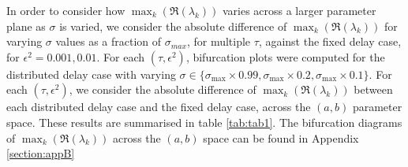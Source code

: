 In order to consider how $\max_k(\Re(\lambda_k))$ varies across a larger parameter plane as $\sigma$ is varied, we consider the absolute difference of $\max_k(\Re(\lambda_k))$ for varying $\sigma$ values as a fraction of $\sigma_{max}$, for multiple $\tau$, against the fixed delay case, for $\epsilon^2=0.001,0.01$. For each $(\tau,\epsilon^2)$, bifurcation plots were computed for the distributed delay case with varying $\sigma\in\{\sigma_{\max}\times0.99,\sigma_{\max}\times0.2,\sigma_{\max}\times0.1\}$. For each $(\tau,\epsilon^2)$, we consider the absolute difference of $\max_k(\Re(\lambda_k))$ between each distributed delay case and the fixed delay case, across the $(a,b)$ parameter space. These results are summarised in table \ref{tab:tab1}. The bifurcation diagrams of $\max_k(\Re(\lambda_k))$ across the $(a,b)$ space can be found in Appendix \ref{section:appB}

